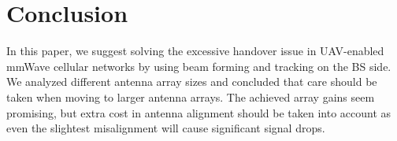 \documentclass[conference,twocolumn]{IEEEtran}
\newcommand{\sofie}[1]{{\color{red}[sp: #1]}}
\begin{document}
\section{Conclusion}
In this paper, we suggest solving the excessive handover issue in UAV-enabled mmWave cellular networks by using beam forming and tracking on the BS side. 
We analyzed different antenna array sizes and concluded that care should be taken when moving to larger antenna arrays. 
The achieved array gains seem promising, but extra cost in antenna alignment should be taken into account as even the slightest misalignment will cause significant signal drops. 
\end{document}
